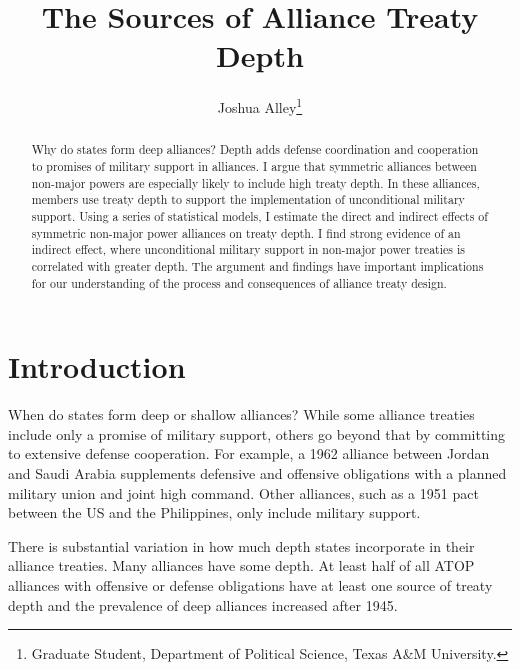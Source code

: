 \documentclass[12pt]{article}
\title{\textbf{The Sources of Alliance Treaty Depth}}
\author{Joshua Alley\footnote{Graduate Student,
Department of Political Science, Texas A\&M University.}}
\date{}
\begin{document}
\maketitle 

\doublespace 

\begin{abstract}
Why do states form deep alliances? 
Depth adds defense coordination and cooperation to promises of military support in alliances.
I argue that symmetric alliances between non-major powers are especially likely to include high treaty depth. 
In these alliances, members use treaty depth to support the implementation of unconditional military support.
Using a series of statistical models, I estimate the direct and indirect effects of symmetric non-major power alliances on treaty depth. 
I find strong evidence of an indirect effect, where unconditional military support in non-major power treaties is correlated with greater depth. 
The argument and findings have important implications for our understanding of the process and consequences of alliance treaty design. 
\end{abstract}


\newpage 


\section{Introduction}


When do states form deep or shallow alliances? 
While some alliance treaties include only a promise of military support, others go beyond that by committing to extensive defense cooperation. 
For example, a 1962 alliance between Jordan and Saudi Arabia supplements defensive and offensive obligations with a planned military union and joint high command. 
Other alliances, such as a 1951 pact between the US and the Philippines, only include military support. 


There is substantial variation in how much depth states incorporate in their alliance treaties. 
Many alliances have some depth. 
At least half of all ATOP alliances with offensive or defense obligations have at least one source of treaty depth and the prevalence of deep alliances increased after 1945. 
\end{document}
